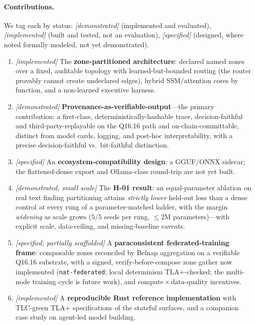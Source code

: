 \documentclass[11pt]{article}
\newcommand{\status}[1]{\textit{[#1]}}
\newcommand{\Qff}{Q16.16}
\begin{document}
\paragraph{Contributions.}
We tag each by status: \status{demonstrated} (implemented and evaluated), \status{implemented}
(built and tested, not an evaluation), \status{specified} (designed, where noted formally modeled,
not yet demonstrated).
\begin{enumerate}[leftmargin=2em,itemsep=1pt]
\item \status{implemented} The \textbf{zone-partitioned architecture}: declared named zones over a
fixed, auditable topology with learned-but-bounded routing (the router provably cannot create
undeclared edges), hybrid SSM/attention cores by function, and a non-learned executive harness.
\item \status{demonstrated} \textbf{Provenance-as-verifiable-output}---the primary
contribution: a first-class, deterministically-hashable trace, decision-faithful and
third-party-replayable on the \Qff{} path and on-chain-committable, distinct from model cards,
logging, and post-hoc interpretability, with a precise decision-faithful vs.\ bit-faithful
distinction.
\item \status{specified} An \textbf{ecosystem-compatibility design}: a GGUF/ONNX sidecar; the
flattened-dense export and Ollama-class round-trip are not yet built.
\item \status{demonstrated, small scale} The \textbf{H-01 result}: an equal-parameter ablation on
real text finding partitioning attains \emph{strictly lower} held-out loss than a dense control at
every rung of a parameter-matched ladder, with the margin \emph{widening} as scale grows ($5/5$ seeds
per rung, $\le$2M parameters)---with explicit scale, data-ceiling, and missing-baseline caveats.
\item \status{specified; partially scaffolded} A \textbf{paraconsistent federated-training frame}:
composable zones reconciled by Belnap aggregation on a verifiable \Qff{} substrate, with a signed,
verify-before-compose zone gather now implemented (\texttt{nat-federated}; local determinism
TLA+-checked; the multi-node training cycle is future work), and
$\mathrm{compute}\times\mathrm{data\text{-}quality}$ incentives.
\item \status{implemented} A \textbf{reproducible Rust reference implementation} with TLC-green
TLA+ specifications of the stateful surfaces, and a companion case study on agent-led model building.
\end{enumerate}
\end{document}
